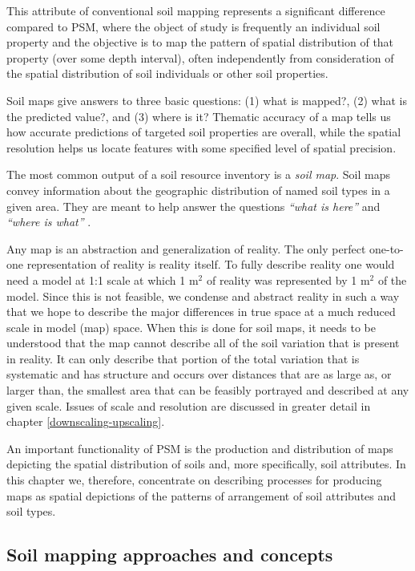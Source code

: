 \documentclass[graybox,natbib,nospthms,UStrade]{svmono}
\let\BeginKnitrBlock\begin \let\EndKnitrBlock\end
\let\BeginKnitrBlock\begin \let\EndKnitrBlock\end
\begin{document}
This attribute of conventional soil mapping represents a significant
difference compared to PSM, where the object of study is
frequently an individual soil property and the objective is to map the
pattern of spatial distribution of that property (over some depth
interval), often independently from consideration of the spatial distribution
of soil individuals or other soil properties.

Soil maps give answers to three basic questions: (1) what is mapped?,
(2) what is the predicted value?, and (3) where is it? Thematic accuracy
of a map tells us how accurate predictions of targeted soil properties
are overall, while the spatial resolution helps us locate features
with some specified level of spatial precision.

\BeginKnitrBlock{rmdnote}
The most common output of a soil resource inventory is a \emph{soil map}. Soil maps convey information
about the geographic distribution of named soil types in a given area.
They are meant to help answer the questions \emph{``what is here''} and \emph{``where is what''} \citep{Burrough1998OUP}.
\EndKnitrBlock{rmdnote}

Any map is an abstraction and generalization of reality. The only
perfect one-to-one representation of reality is reality itself. To fully
describe reality one would need a model at 1:1 scale at which 1 m\(^2\) of reality
was represented by 1 m\(^2\) of the model. Since this is not feasible, we condense
and abstract reality in such a way that we hope to describe the major
differences in true space at a much reduced scale in model (map) space.
When this is done for soil maps, it needs to be understood that the map
cannot describe all of the soil variation that is present in reality. It can
only describe that portion of the total variation that is systematic and
has structure and occurs over distances that are as large as, or larger
than, the smallest area that can be feasibly portrayed and described at
any given scale. Issues of scale and resolution are discussed in greater
detail in chapter \ref{downscaling-upscaling}.

An important functionality of PSM is the production and distribution of
maps depicting the spatial distribution of soils and, more specifically,
soil attributes. In this chapter we, therefore, concentrate on
describing processes for producing maps as spatial depictions of the
patterns of arrangement of soil attributes and soil types.

\hypertarget{soil-mapping-approaches-and-concepts}{%
\subsection{Soil mapping approaches and concepts}\label{soil-mapping-approaches-and-concepts}}
\end{document}
